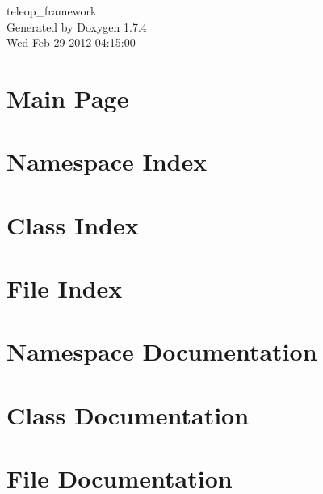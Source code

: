 \documentclass[a4paper]{book}
\begin{document}
\begin{titlepage}
\vspace*{7cm}
\begin{center}
{\Large teleop\_\-framework }\\
\vspace*{1cm}
{\large Generated by Doxygen 1.7.4}\\
\vspace*{0.5cm}
{\small Wed Feb 29 2012 04:15:00}\\
\end{center}
\end{titlepage}
\clearemptydoublepage
{}
\tableofcontents
\clearemptydoublepage
{}
\chapter{Main Page}
\label{index}
\chapter{Namespace Index}

\chapter{Class Index}

\chapter{File Index}

\chapter{Namespace Documentation}

\chapter{Class Documentation}






\chapter{File Documentation}






\printindex
\end{document}
